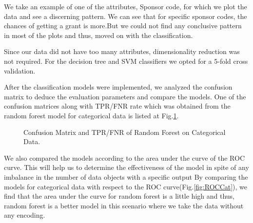 \documentclass{article} %
\begin{document}
	We take an example of one of the attributes, Sponsor code, for which we plot the data and see a discerning pattern. We can see that for specific sponsor codes, the chances of getting a grant is more.But we could not find any conclusive pattern in most of the plots and thus, moved on with the classification. 
	
	Since our data did not have too many attributes, dimensionality reduction was not required. For the decision tree and SVM classifiers we opted for a 5-fold cross validation. 
	
	After the classification models were implemented, we analyzed the confusion matrix to deduce the evaluation parameters and compare the models. One of the confusion matrices along with TPR/FNR rate which was obtained from the random forest model for categorical data is listed at Fig.\ref{fig:RFCM}. 
	
	\begin{figure}[h]
		\begin{center}
		\end{center}
		\caption{Confusion Matrix and TPR/FNR of Random Forest on Categorical Data.}
		\label{fig:RFCM}
	\end{figure}
	
	

	
	We also compared the models according to the area under the curve of the ROC curve. This will help us to determine the effectiveness of the model in spite of any imbalance in the number of data objects with a specific output
	By comparing the models for categorical data with respect to the ROC curve(Fig.\ref{fig:ROCCat}), we find that the area under the curve for random forest is a little high and thus, random forest is a better model in this scenario where we take the data without any encoding.
	
\end{document}
